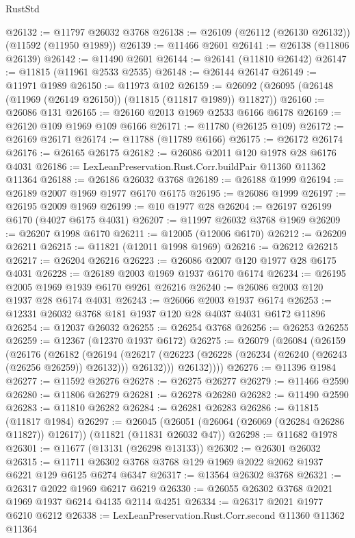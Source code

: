 \begin{lexlean}{RustStd}
\begin{coremodule}
@26132 := @11797 @26032 @3768
@26138 := @26109 (@26112 (@26130 @26132)) (@11592 (@11950 @1989))
@26139 := @11466 @2601
@26141 := @26138 (@11806 @26139)
@26142 := @11490 @2601
@26144 := @26141 (@11810 @26142)
@26147 := @11815 (@11961 @2533 @2535)
@26148 := @26144 @26147
@26149 := @11971 @1989
@26150 := @11973 @102
@26159 := @26092 (@26095 (@26148 (@11969 (@26149 @26150)) (@11815 (@11817 @1989)) @11827))
@26160 := @26086 @131
@26165 := @26160 @2013 @1969 @2533 @6166 @6178
@26169 := @26120 @109 @1969 @109 @6166
@26171 := @11780 (@26125 @109)
@26172 := @26169 @26171
@26174 := @11788 (@11789 @6166)
@26175 := @26172 @26174
@26176 := @26165 @26175
@26182 := @26086 @2011 @120 @1978 @28 @6176 @4031
@26186 := LexLeanPreservation.Rust.Corr.buildPair @11360 @11362 @11364
@26188 := @26186 @26032 @3768
@26189 := @26188 @1999
@26194 := @26189 @2007 @1969 @1977 @6170 @6175
@26195 := @26086 @1999
@26197 := @26195 @2009 @1969
@26199 := @10 @1977 @28
@26204 := @26197 @26199 @6170 (@4027 @6175 @4031)
@26207 := @11997 @26032 @3768 @1969
@26209 := @26207 @1998 @6170
@26211 := @12005 (@12006 @6170)
@26212 := @26209 @26211
@26215 := @11821 (@12011 @1998 @1969)
@26216 := @26212 @26215
@26217 := @26204 @26216
@26223 := @26086 @2007 @120 @1977 @28 @6175 @4031
@26228 := @26189 @2003 @1969 @1937 @6170 @6174
@26234 := @26195 @2005 @1969 @1939 @6170 @9261 @26216
@26240 := @26086 @2003 @120 @1937 @28 @6174 @4031
@26243 := @26066 @2003 @1937 @6174
@26253 := @12331 @26032 @3768 @181 @1937 @120 @28 @4037 @4031 @6172 @11896
@26254 := @12037 @26032
@26255 := @26254 @3768
@26256 := @26253 @26255
@26259 := @12367 (@12370 @1937 @6172)
@26275 := @26079
    (@26084
      (@26159
        (@26176
          (@26182
            (@26194
              (@26217 (@26223 (@26228 (@26234 (@26240 (@26243 (@26256 @26259)) @26132))) @26132)))
            @26132))))
@26276 := @11396 @1984
@26277 := @11592 @26276
@26278 := @26275 @26277
@26279 := @11466 @2590
@26280 := @11806 @26279
@26281 := @26278 @26280
@26282 := @11490 @2590
@26283 := @11810 @26282
@26284 := @26281 @26283
@26286 := @11815 (@11817 @1984)
@26297 := @26045
    (@26051 (@26064 (@26069 (@26284 @26286 @11827)) @12617))
    (@11821 (@11831 @26032 @47))
@26298 := @11682 @1978
@26301 := @11677 (@13131 (@26298 @13133))
@26302 := @26301 @26032
@26315 := @11711 @26302 @3768 @3768 @129 @1969 @2022 @2062 @1937 @6221 @129 @6125 @6274 @6347
@26317 := @13564 @26302 @3768
@26321 := @26317 @2022 @1969 @6217 @6219
@26330 := @26055 @26302 @3768 @2021 @1969 @1937 @6214 @4135 @2114 @4251
@26334 := @26317 @2021 @1977 @6210 @6212
@26338 := LexLeanPreservation.Rust.Corr.second @11360 @11362 @11364

\end{coremodule}
\end{lexlean}
